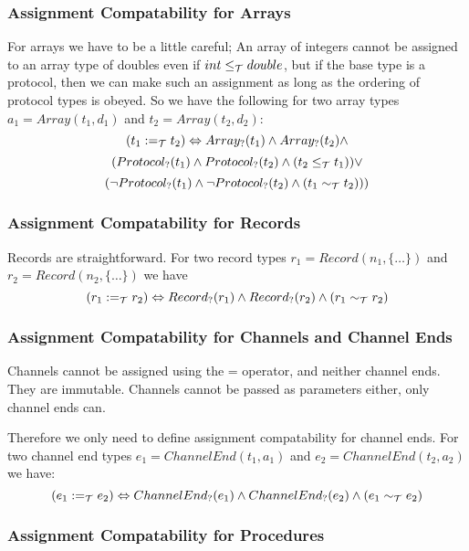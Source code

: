\documentclass[pdflatex,11pt,letter]{article}
\newcommand{\teq}{\sim_{\cal T}}
\newcommand{\ac}{:=_{\cal T}}
\newcommand{\tlt}{\leq_{\cal T}}
\begin{document}
\subsubsection{Assignment Compatability for Arrays}

For arrays we have to be a little careful; An array of integers cannot be assigned to an array type of doubles even if $int \tlt double$, but if the base type is a protocol, then we can make such an assignment as long as the ordering of protocol types is obeyed. So we have the following for two array types $a_1 = Array(t_1, d_1)$ and $t_2 = Array(t_2, d_2)$:
\[
(t_1 \ac t_2) \Leftrightarrow Array_?(t_1) \wedge Array_?(t_2) \wedge
\]
\[
(Protocol_?(t_1) \wedge Protocol_?(t_2) \wedge (t_2 \tlt t_1)) \vee
\]
\[
(\neg{}Protocol_?(t_1) \wedge \neg{}Protocol_?(t_2) \wedge (t_1 \teq t_2)))
\] 

\subsubsection{Assignment Compatability for Records}

Records are straightforward. For two record types $r_1 = Record(n_1,\{\ldots\})$ and $r_2 = Record(n_2,\{\ldots\})$ we have
\[
(r_1 \ac r_2) \Leftrightarrow Record_?(r_1) \wedge Record_?(r_2) \wedge (r_1 \teq r_2)
\]

\subsubsection{Assignment Compatability for Channels and Channel Ends}

Channels cannot be assigned using the = operator, and neither channel ends. They are immutable. Channels cannot be passed as parameters either, only channel ends can.

Therefore we only need to define assignment compatability for channel ends. For two channel end types $e_1 = ChannelEnd(t_1, a_1)$ and $e_2 = ChannelEnd(t_2, a_2)$ we have:
\[
(e_1 \ac e_2) \Leftrightarrow ChannelEnd_?(e_1) \wedge ChannelEnd_?(e_2) \wedge (e_1 \teq e_2)
\]

\subsubsection{Assignment Compatability for Procedures}
\end{document}
